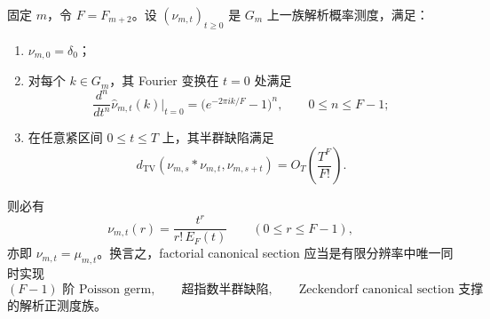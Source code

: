 \begin{conjecture}\label{conj:conclusion-zeckendorf-euler-finite-resolution-rigidity}
固定 \(m\)，令 \(F=F_{m+2}\)。设 \((\nu_{m,t})_{t\ge 0}\) 是 \(G_m\) 上一族解析概率测度，满足：
\begin{enumerate}
  \item \(\nu_{m,0}=\delta_0\)；
  \item 对每个 \(k\in G_m\)，其 Fourier 变换在 \(t=0\) 处满足
  \[
  \frac{d^n}{dt^n}\widehat\nu_{m,t}(k)\Big|_{t=0}
  =
  \bigl(e^{-2\pi i k/F}-1\bigr)^n,
  \qquad
  0\le n\le F-1;
  \]
  \item 在任意紧区间 \(0\le t\le T\) 上，其半群缺陷满足
  \[
  d_{\mathrm{TV}}(\nu_{m,s}*\nu_{m,t},\nu_{m,s+t})
  =
  O_T\!\left(\frac{T^F}{F!}\right).
  \]
\end{enumerate}
则必有
\[
\nu_{m,t}(r)=\frac{t^r}{r!\,E_F(t)}
\qquad (0\le r\le F-1),
\]
亦即 \(\nu_{m,t}=\mu_{m,t}\)。换言之，factorial canonical section 应当是有限分辨率中唯一同时实现
\[
\text{\((F-1)\) 阶 Poisson germ},
\qquad
\text{超指数半群缺陷},
\qquad
\text{Zeckendorf canonical section 支撑}
\]
的解析正测度族。
\end{conjecture}
